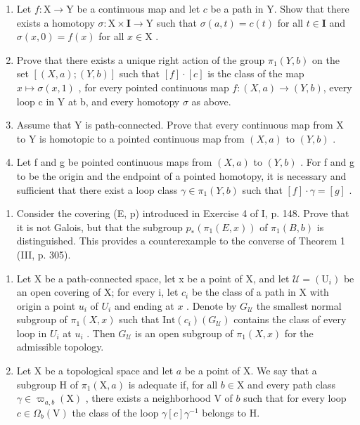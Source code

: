 \begin{enumerate}
\def\labelenumi{\alph{enumi})}
\item
  Let \(f \colon \mathrm{X} \to \mathrm{Y}\) be a continuous map and let \(c\) be a path in Y. Show that there exists a homotopy \(\sigma \colon \mathrm{X} \times \mathbf{I} \to \mathrm{Y}\) such that \(\sigma(a, t) = c(t)\) for all \(t \in \mathbf{I}\) and \(\sigma(x, 0) = f(x)\) for all \(x \in \mathrm{X}\) .
\item
  Prove that there exists a unique right action of the group \(\pi_{1}(Y,b)\) on the set \([(X,a);(Y,b)]\) such that \([f]\cdot[c]\) is the class of the map \(x\mapsto\sigma(x,1)\) , for every pointed continuous map \(f\colon(X,a)\to(Y,b)\), every loop c in Y at b, and every homotopy \(\sigma\) as above.
\item
  Assume that Y is path-connected. Prove that every continuous map from X to Y is homotopic to a pointed continuous map from \((X, a)\) to \((Y, b)\) .
\item
  Let f and g be pointed continuous maps from \((X, a)\) to \((Y, b)\) . For f and g to be the origin and the endpoint of a pointed homotopy, it is necessary and sufficient that there exist a loop class \(\gamma \in \pi_{1}(Y, b)\) such that \([f] \cdot \gamma = [g]\) .
\end{enumerate}

\exercisegroup

\begin{enumerate}
\def\labelenumi{\arabic{enumi})}
\tightlist
\item
  Consider the covering (E, p) introduced in Exercise 4 of I, p. 148. Prove that it is not Galois, but that the subgroup \(p_{*}(\pi_{1}(E, x))\) of \(\pi_{1}(B, b)\) is distinguished. This provides a counterexample to the converse of Theorem 1 (III, p. 305).
\end{enumerate}

\exercisegroup

\begin{enumerate}
\def\labelenumi{\arabic{enumi})}
\item
  Let X be a path-connected space, let x be a point of X, and let \(\mathcal{U} = (\mathrm{U}_{i})\) be an open covering of X; for every i, let \(c_{i}\) be the class of a path in X with origin a point \(u_i\) of \(U_i\) and ending at \(x\) . Denote by \(G_{\mathcal{U}}\) the smallest normal subgroup of \(\pi_1(X,x)\) such that \(\text{Int}(c_i)(G_{\mathcal{U}})\) contains the class of every loop in \(U_i\) at \(u_i\) . Then \(G_{\mathcal{U}}\) is an open subgroup of \(\pi_1(X,x)\) for the admissible topology.
\item
  Let X be a topological space and let \(a\) be a point of X. We say that a subgroup H of \(\pi_1(\mathrm{X}, a)\) is adequate if, for all \(b \in \mathrm{X}\) and every path class \(\gamma \in \varpi_{a,b}(\mathrm{X})\) , there exists a neighborhood V of \(b\) such that for every loop \(c \in \Omega_b(\mathrm{V})\) the class of the loop \(\gamma[c]\gamma^{-1}\) belongs to H.
\end{enumerate}

